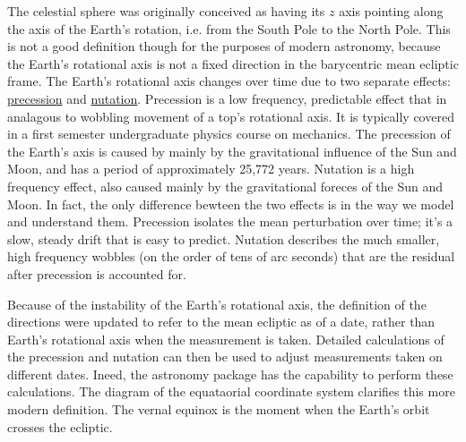 The celestial sphere was originally conceived as having its $z$ axis pointing along the axis of the Earth's rotation, i.e. from the South Pole to the North Pole.
This is not a good definition though for the purposes of modern astronomy, 
because the Earth's rotational axis is not a fixed direction in the barycentric mean ecliptic frame.
The Earth's rotational axis changes over time due to two separate effects: 
\href{https://en.wikipedia.org/wiki/Axial_precession}{precession} and \href{https://en.wikipedia.org/wiki/Astronomical_nutation}{nutation}.
Precession is a low frequency, predictable effect that in analagous to wobbling movement of a top's rotational axis.
It is typically covered in a first semester undergraduate physics course on mechanics.
The precession of the Earth's axis is caused by mainly by the gravitational influence of the Sun and Moon, and has a period of approximately 25,772 years.
Nutation is a high frequency effect, also caused mainly by the gravitational foreces of the Sun and Moon.
In fact, the only difference bewteen the two effects is in the way we model and understand them.
Precession isolates the mean perturbation over time; it's a slow, steady drift that is easy to predict.
Nutation describes the much smaller, high frequency wobbles (on the order of tens of arc seconds) that are the residual after precession is accounted for.

Because of the instability of the Earth's rotational axis, the definition of the directions were updated to refer to the mean ecliptic as of a date,
rather than Earth's rotational axis when the measurement is taken.
Detailed calculations of the precession and nutation can then be used to adjust measurements taken on different dates.
Ineed, the  astronomy package has the capability to perform these calculations.
The diagram of the equataorial coordinate system clarifies this more modern definition.  
The vernal equinox is the moment when the Earth's orbit crosses the ecliptic.

